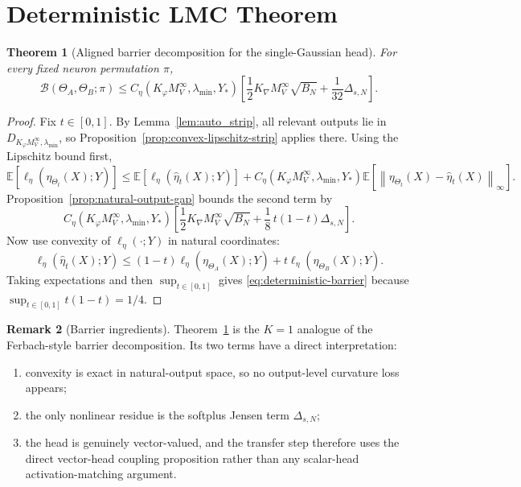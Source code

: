 \documentclass[11pt]{article}
\newtheorem{theorem}{Theorem}
\theoremstyle{definition}
\newtheorem{remark}[theorem]{Remark}
\newcommand{\E}{\mathbb{E}}
\newcommand{\norm}[1]{\left\lVert #1 \right\rVert}
\newcommand{\cB}{\mathcal{B}}
\begin{document}
\section{Deterministic LMC Theorem}

\begin{theorem}[Aligned barrier decomposition for the single-Gaussian head]
\label{thm:deterministic-lmc}
For every fixed neuron permutation $\pi$,
\begin{equation}
  \cB(\Theta_A,\Theta_B;\pi)
  \le
  C_\eta(K_\varphi M_V^\infty,\lambda_{\min},Y_\ast)
  \left[
    \frac12 K_{\nabla} M_V^\infty \sqrt{B_N}
    +
    \frac1{32}\Delta_{s,N}
  \right].
  \label{eq:deterministic-barrier}
\end{equation}
\end{theorem}

\begin{proof}
Fix $t\in[0,1]$. By Lemma~\ref{lem:auto_strip}, all relevant outputs lie in
$D_{K_\varphi M_V^\infty,\lambda_{\min}}$, so
Proposition~\ref{prop:convex-lipschitz-strip} applies there.
Using the Lipschitz bound first,
\[
  \E[\ell_\eta(\eta_{\Theta_t}(X);Y)]
  \le
  \E[\ell_\eta(\hat\eta_t(X);Y)]
  +
  C_\eta(K_\varphi M_V^\infty,\lambda_{\min},Y_\ast)
  \E[\norm{\eta_{\Theta_t}(X)-\hat\eta_t(X)}_\infty].
\]
Proposition~\ref{prop:natural-output-gap} bounds the second term by
\[
  C_\eta(K_\varphi M_V^\infty,\lambda_{\min},Y_\ast)
  \left[
    \frac12 K_{\nabla} M_V^\infty \sqrt{B_N}
    +
    \frac18\,t(1-t)\Delta_{s,N}
  \right].
\]
Now use convexity of $\ell_\eta(\cdot;Y)$ in natural coordinates:
\[
  \ell_\eta(\hat\eta_t(X);Y)
  \le
  (1-t)\ell_\eta(\eta_{\Theta_A}(X);Y)
  +
  t\ell_\eta(\eta_{\Theta_B}(X);Y).
\]
Taking expectations and then $\sup_{t\in[0,1]}$ gives
\eqref{eq:deterministic-barrier} because $\sup_{t\in[0,1]} t(1-t)=1/4$.
\end{proof}

\begin{remark}[Barrier ingredients]
Theorem~\ref{thm:deterministic-lmc} is the $K=1$ analogue of the
Ferbach-style barrier decomposition. Its two terms have a direct interpretation:
\begin{enumerate}[label=(\alph*)]
  \item convexity is exact in natural-output space, so no output-level
  curvature loss appears;
  \item the only nonlinear residue is the softplus Jensen term
  $\Delta_{s,N}$;
  \item the head is genuinely vector-valued, and the transfer step therefore
  uses the direct vector-head coupling proposition rather than any scalar-head
  activation-matching argument.
\end{enumerate}
\end{remark}
\end{document}
